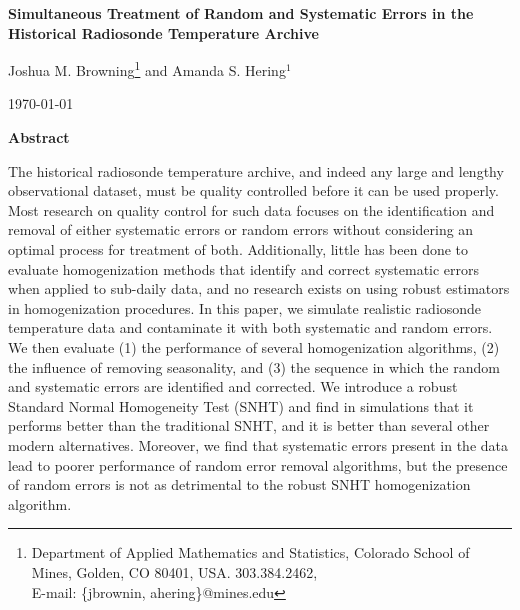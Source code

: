 \documentclass[12pt]{article}
\def\ni{\noindent}
\begin{document}
\thispagestyle{empty}
\baselineskip=28pt
\vskip 5mm
\begin{center} {\Large{\bf   Simultaneous Treatment of Random and Systematic Errors in the Historical Radiosonde Temperature Archive}}
\end{center}



\baselineskip=12pt
\vskip 5mm

\begin{center}\large
Joshua M. Browning\footnote{ \baselineskip=10pt
Department of Applied Mathematics and Statistics, Colorado School of Mines, Golden, CO 80401,
USA. 303.384.2462, \\E-mail: \{jbrownin, ahering\}@mines.edu} and Amanda S. Hering$^1$




\end{center}

\baselineskip=17pt
\vskip 5mm
\centerline{\today}
\vskip 5mm

\begin{center}
{\large{\bf Abstract}}
\end{center}

\baselineskip=14pt

\ni  The historical radiosonde temperature archive, and indeed any large and lengthy observational dataset, must be quality controlled before it can be used properly.   Most research on quality control for such data focuses on the identification and removal of either systematic errors or random errors without considering an optimal process for treatment of both.  Additionally, little has been done to evaluate  homogenization methods that identify and correct systematic errors when applied to sub-daily data, and no research exists on using robust estimators in homogenization procedures.  In this paper, we simulate realistic radiosonde temperature data and contaminate it with both systematic and random errors.  We then evaluate (1) the performance of several homogenization algorithms, (2) the influence of removing seasonality, and (3) the sequence in which the random and systematic errors are identified and corrected.  We introduce a robust Standard Normal Homogeneity Test (SNHT) and find in simulations that it performs better than the traditional SNHT, and it is better than several other modern alternatives.  Moreover, we find that systematic errors present in the data lead to poorer performance of random error removal algorithms, but the presence of random errors is not as detrimental to the robust SNHT homogenization algorithm.
\end{document}
